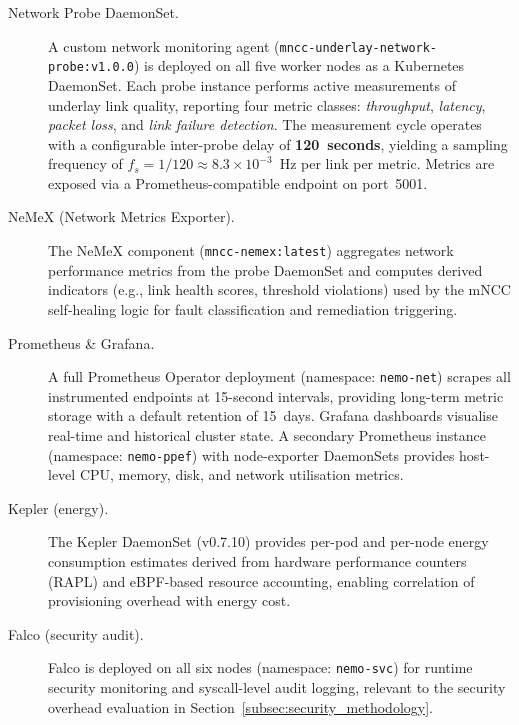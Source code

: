 \begin{description}
  \item[Network Probe DaemonSet.]
    A custom network monitoring agent
    (\texttt{mncc-underlay-network-probe:v1.0.0}) is deployed on
    all five worker nodes as a Kubernetes DaemonSet.
    Each probe instance performs active measurements of underlay
    link quality, reporting four metric classes: \emph{throughput},
    \emph{latency}, \emph{packet loss}, and \emph{link failure
    detection}.
    The measurement cycle operates with a configurable inter-probe
    delay of \textbf{120~seconds}, yielding a sampling frequency of
    $f_s = 1/120 \approx 8.3 \times 10^{-3}$~Hz per link per
    metric.
    Metrics are exposed via a Prometheus-compatible endpoint on
    port~5001.

  \item[NeMeX (Network Metrics Exporter).]
    The NeMeX component (\texttt{mncc-nemex:latest}) aggregates
    network performance metrics from the probe DaemonSet and
    computes derived indicators (e.g., link health scores,
    threshold violations) used by the mNCC self-healing logic for
    fault classification and remediation triggering.

  \item[Prometheus \& Grafana.]
    A full Prometheus Operator deployment
    (namespace: \texttt{nemo-net}) scrapes all instrumented
    endpoints at 15-second intervals, providing long-term metric
    storage with a default retention of 15~days.
    Grafana dashboards visualise real-time and historical cluster
    state.
    A secondary Prometheus instance (namespace: \texttt{nemo-ppef})
    with node-exporter DaemonSets provides host-level CPU, memory,
    disk, and network utilisation metrics.

  \item[Kepler (energy).]
    The Kepler DaemonSet (v0.7.10) provides per-pod and per-node
    energy consumption estimates derived from hardware performance
    counters (RAPL) and eBPF-based resource accounting, enabling
    correlation of provisioning overhead with energy cost.

  \item[Falco (security audit).]
    Falco is deployed on all six nodes (namespace: \texttt{nemo-svc})
    for runtime security monitoring and syscall-level audit logging,
    relevant to the security overhead evaluation in
    Section~\ref{subsec:security_methodology}.
\end{description}

